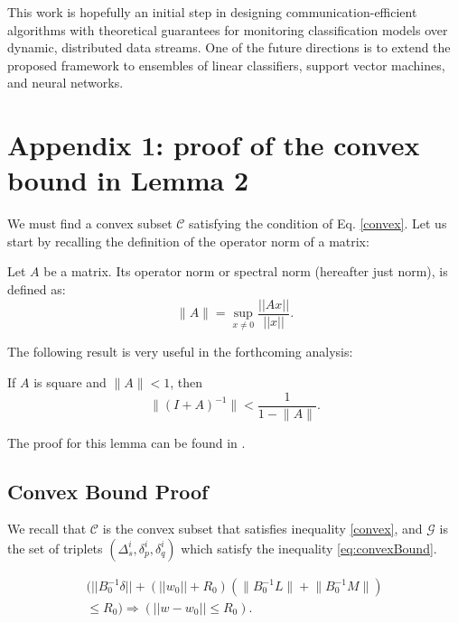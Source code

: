 This work is hopefully an initial step in designing communication-efficient algorithms
with theoretical guarantees for monitoring classification models over dynamic, distributed data streams. One of the future directions is to extend the proposed framework to
ensembles of linear classifiers, support vector machines, and neural networks.


\nocite{*}

\section{Appendix 1: proof of the convex bound in Lemma 2}
\label{sec:appendix1}
We must find a convex subset $\mathcal{C}$ satisfying the condition of Eq. \ref{convex}. Let
us start by recalling the definition of the operator norm of a matrix:
\begin{definition}
Let $A$ be a matrix. Its operator norm or
spectral norm (hereafter just norm), is defined as:
\begin{equation}
\Big \| A \Big \| = \sup_{x \neq 0}\frac{||Ax||}{||x||}.
\end{equation}
\end{definition}
The following result is very useful in the forthcoming analysis:
\begin{lemma} \label{lemma:newman}
If $A$ is square and $\Big \| A \Big \| < 1$, then
\begin{equation*}
\Big \| (I+A)^{-1} \Big \| < \frac{1}{1- \Big \|A \Big \|}.
\end{equation*}
\end{lemma}
The proof for this lemma can be found in \cite{gabel2015monitoring}.

\subsection{Convex Bound Proof}
We recall that $\mathcal{C}$ is the convex subset that satisfies
inequality \ref{convex}, and $\mathcal{G}$ is the set of triplets
$(\Delta_s^i, \delta_p^i, \delta_q^i)$
which satisfy the inequality \ref{eq:convexBound}.

\begin{lemma} \label{GinC}
\begin{equation}
\begin{split}
(||B_0^{-1}\delta|| + (||w_0||+R_0)(\Big \|B_0^{-1}L\Big \|+\Big \|B_0^{-1}M\Big \|) \\
 \leq R_0) \Rightarrow (||w-w_0|| \leq R_0).
\end{split}
\end{equation}
\end{lemma}

